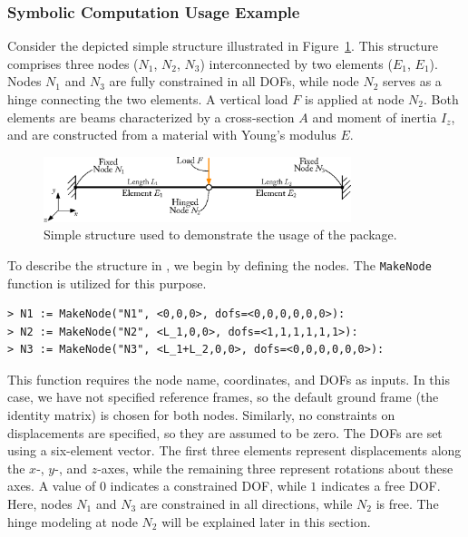 \subsubsection{Symbolic Computation Usage Example}

Consider the depicted simple structure illustrated in Figure~\ref{app4:fig:usage_example}. This structure comprises three nodes ($N_1$, $N_2$, $N_3$) interconnected by two elements ($E_1$, $E_1$). Nodes $N_1$ and $N_3$ are fully constrained in all \acp{DOF}, while node $N_2$ serves as a hinge connecting the two elements. A vertical load $F$ is applied at node $N_2$. Both elements are beams characterized by a cross-section $A$ and moment of inertia $I_z$, and are constructed from a material with Young's modulus $E$.

\begin{figure}[htb]
  \centering
  \includegraphics[width=0.8\textwidth]{./figures/appendix_4/usage_example.eps}
  \caption{Simple structure used to demonstrate the usage of the \TrussMe{} package.}
  \label{app4:fig:usage_example}
\end{figure}

To describe the structure in \TrussMe{}, we begin by defining the nodes. The \texttt{MakeNode} function is utilized for this purpose.
%
\begin{verbatim}
> N1 := MakeNode("N1", <0,0,0>, dofs=<0,0,0,0,0,0>):
> N2 := MakeNode("N2", <L_1,0,0>, dofs=<1,1,1,1,1,1>):
> N3 := MakeNode("N3", <L_1+L_2,0,0>, dofs=<0,0,0,0,0,0>):
\end{verbatim}
%
This function requires the node name, coordinates, and \acp{DOF} as inputs. In this case, we have not specified reference frames, so the default ground frame (the identity matrix) is chosen for both nodes. Similarly, no constraints on displacements are specified, so they are assumed to be zero. The \acp{DOF} are set using a six-element vector. The first three elements represent displacements along the $x$-, $y$-, and $z$-axes, while the remaining three represent rotations about these axes. A value of $0$ indicates a constrained \ac{DOF}, while $1$ indicates a free \ac{DOF}. Here, nodes $N_1$ and $N_3$ are constrained in all directions, while $N_2$ is free. The hinge modeling at node $N_2$ will be explained later in this section.


